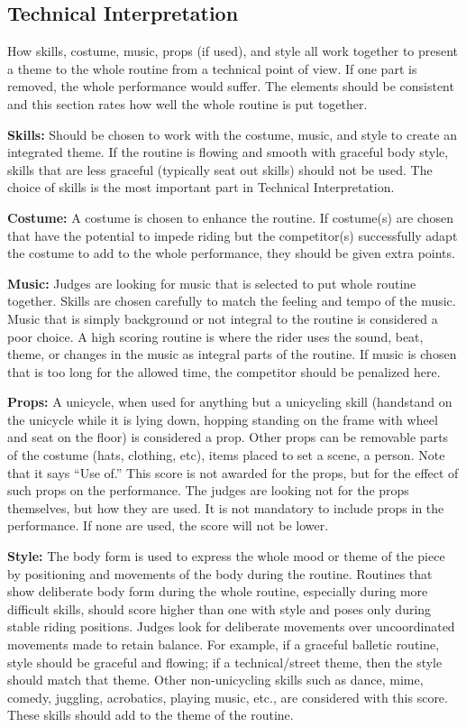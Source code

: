 \subsection{Technical Interpretation}
How skills, costume, music, props (if used), and style all work together to present a theme to the whole routine from a technical point of view.
If one part is removed, the whole performance would suffer.
The elements should be consistent and this section rates how well the whole routine is put together.

\textbf{Skills:} Should be chosen to work with the costume, music, and style to create an integrated theme.
If the routine is flowing and smooth with graceful body style, skills that are less graceful (typically seat out skills) should not be used.
The choice of skills is the most important part in Technical Interpretation.

\textbf{Costume:} A costume is chosen to enhance the routine.
If costume(s) are chosen that have the potential to impede riding but the competitor(s) successfully adapt the costume to add to the whole performance, they should be given extra points.

\textbf{Music:} Judges are looking for music that is selected to put whole routine together.
Skills are chosen carefully to match the feeling and tempo of the music.
Music that is simply background or not integral to the routine is considered a poor choice.
A high scoring routine is where the rider uses the sound, beat, theme, or changes in the music as integral parts of the routine.
If music is chosen that is too long for the allowed time, the competitor should be penalized here.

\textbf{Props:} A unicycle, when used for anything but a unicycling skill (handstand on the unicycle while it is lying down, hopping standing on the frame with wheel and seat on the floor) is considered a prop.
Other props can be removable parts of the costume (hats, clothing, etc), items placed to set a scene, a person.
Note that it says ``Use of.'' This score is not awarded for the props, but for the effect of such props on the performance.
The judges are looking not for the props themselves, but how they are used.
It is not mandatory to include props in the performance.
If none are used, the score will not be lower.

\textbf{Style:} The body form is used to express the whole mood or theme of the piece by positioning and movements of the body during the routine.
Routines that show deliberate body form during the whole routine, especially during more difficult skills, should score higher than one with style and poses only during stable riding positions.
Judges look for deliberate movements over uncoordinated movements made to retain balance.
For example, if a graceful balletic routine, style should be graceful and flowing; if a technical/street theme, then the style should match that theme.
Other non-unicycling skills such as dance, mime, comedy, juggling, acrobatics, playing music, etc., are considered with this score.
These skills should add to the theme of the routine.

